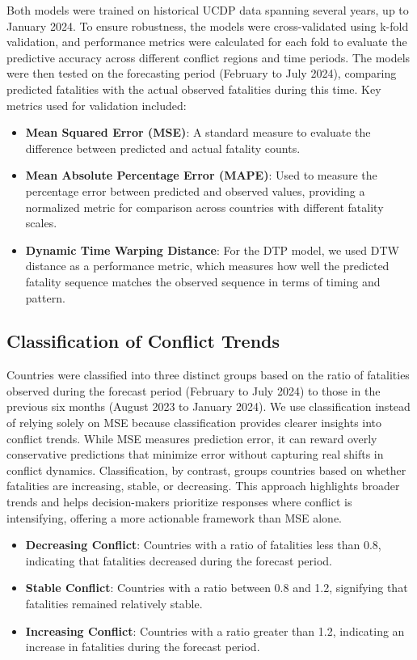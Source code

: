 \documentclass[twocolumn]{erdc}
\begin{document}
Both models were trained on historical UCDP data spanning several years, up to January 2024. To ensure robustness, the models were cross-validated using k-fold validation, and performance metrics were calculated for each fold to evaluate the predictive accuracy across different conflict regions and time periods. The models were then tested on the forecasting period (February to July 2024), comparing predicted fatalities with the actual observed fatalities during this time. Key metrics used for validation included:
\begin{itemize}
    \item \textbf{Mean Squared Error (MSE)}: A standard measure to evaluate the difference between predicted and actual fatality counts.
    \item \textbf{Mean Absolute Percentage Error (MAPE)}: Used to measure the percentage error between predicted and observed values, providing a normalized metric for comparison across countries with different fatality scales.
    \item \textbf{Dynamic Time Warping Distance}: For the DTP model, we used DTW distance as a performance metric, which measures how well the predicted fatality sequence matches the observed sequence in terms of timing and pattern.
\end{itemize}

\subsection*{Classification of Conflict Trends}

Countries were classified into three distinct groups based on the ratio of fatalities observed during the forecast period (February to July 2024) to those in the previous six months (August 2023 to January 2024). We use classification instead of relying solely on MSE because classification provides clearer insights into conflict trends. While MSE measures prediction error, it can reward overly conservative predictions that minimize error without capturing real shifts in conflict dynamics. Classification, by contrast, groups countries based on whether fatalities are increasing, stable, or decreasing. This approach highlights broader trends and helps decision-makers prioritize responses where conflict is intensifying, offering a more actionable framework than MSE alone.

\begin{itemize}
    \item \textbf{Decreasing Conflict}: Countries with a ratio of fatalities less than 0.8, indicating that fatalities decreased during the forecast period.
    \item \textbf{Stable Conflict}: Countries with a ratio between 0.8 and 1.2, signifying that fatalities remained relatively stable.
    \item \textbf{Increasing Conflict}: Countries with a ratio greater than 1.2, indicating an increase in fatalities during the forecast period.
\end{itemize}
\end{document}
